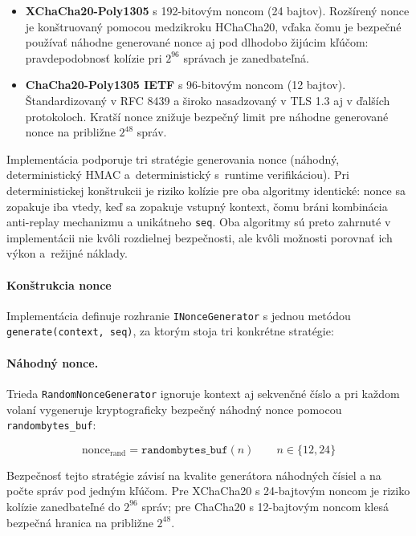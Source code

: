 \begin{itemize}[leftmargin=*,itemsep=2pt]
  \item \textbf{XChaCha20-Poly1305} s 192-bitovým noncom (24 bajtov). Rozšírený nonce je konštruovaný pomocou medzikroku HChaCha20, vďaka čomu je bezpečné používať náhodne generované nonce aj pod dlhodobo žijúcim kľúčom: pravdepodobnosť kolízie pri $2^{96}$ správach je zanedbateľná\cite{XChaChaDraft,LibsodiumXChaChaDoc}.
  \item \textbf{ChaCha20-Poly1305 IETF} s 96-bitovým noncom (12 bajtov). Štandardizovaný v RFC 8439 a široko nasadzovaný v TLS 1.3 aj v ďalších protokoloch\cite{RFC8439}. Kratší nonce znižuje bezpečný limit pre náhodne generované nonce na približne $2^{48}$ správ.
\end{itemize}

Implementácia podporuje tri stratégie generovania nonce (náhodný, deterministický HMAC a~deterministický s~runtime verifikáciou). Pri deterministickej konštrukcii je riziko kolízie pre oba algoritmy identické: nonce sa zopakuje iba vtedy, keď sa zopakuje vstupný kontext, čomu bráni kombinácia anti-replay mechanizmu a unikátneho \texttt{seq}. Oba algoritmy sú preto zahrnuté v implementácii nie kvôli rozdielnej bezpečnosti, ale kvôli možnosti porovnať ich výkon a~režijné náklady.

\paragraph{Konštrukcia nonce}

Implementácia definuje rozhranie \texttt{INonceGenerator} s jednou metódou \texttt{generate(context, seq)}, za ktorým stoja tri konkrétne stratégie:

\paragraph{Náhodný nonce.}
Trieda \texttt{RandomNonceGenerator} ignoruje kontext aj sekvenčné číslo a pri každom volaní vygeneruje kryptograficky bezpečný náhodný nonce pomocou \texttt{randombytes\_buf}:

\begin{equation}
\text{nonce}_{\text{rand}} = \texttt{randombytes\_buf}(n) \qquad n \in \{12, 24\}
\end{equation}

Bezpečnosť tejto stratégie závisí na kvalite generátora náhodných čísiel a na počte správ pod jedným kľúčom. Pre XChaCha20 s 24-bajtovým noncom je riziko kolízie zanedbateľné do $2^{96}$ správ; pre ChaCha20 s 12-bajtovým noncom klesá bezpečná hranica na približne $2^{48}$.

